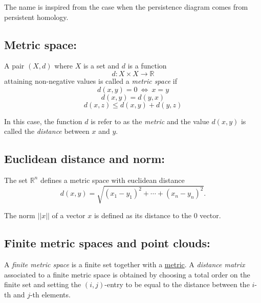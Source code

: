 \documentclass{amsart}
\begin{document}
	The name is inspired from the case when the persistence diagram comes from persistent homology.
	
	\subsection*{Metric space:} \label{metric space}
	
	A pair $(X, d)$ where $X$ is a set and $d$ is a function 
	\begin{equation*}
	d : X \times X \to \mathbb R
	\end{equation*}
	attaining non-negative values is called a \textit{metric space} if
	\begin{equation*}
	d(x,y) = 0\ \Leftrightarrow\ x = y
	\end{equation*}
	\begin{equation*}
	d(x,y) = d(y,x)
	\end{equation*}
	\begin{equation*}
	d(x,z) \leq d(x,y) + d(y, z)
	\end{equation*}
	
	In this case, the function $d$ is refer to as the \textit{metric} and the value $d(x,y)$ is called the \textit{distance} between $x$ and $y$. 
	
	\subsection*{Euclidean distance and norm:} \label{euclidean distance and norm}
	
	The set $\mathbb R^n$ defines a metric space with euclidean distance
	\begin{equation*}
	d(x,y) = \sqrt{(x_1-y_1)^2 + \cdots + (x_n-y_n)^2}.
	\end{equation*}
	
	The norm $||x||$ of a vector $x$ is defined as its distance to the $0$ vector.
	
	\subsection*{Finite metric spaces and point clouds:} \label{finite metric spaces and point clouds}
	
	A \textit{finite metric space} is a finite set together with a \hyperref[metric space]{metric}. A \textit{distance matrix} associated to a finite metric space is obtained by choosing a total order on the finite set and setting the $(i,j)$-entry to be equal to the distance between the $i$-th and $j$-th elements. 
	
\end{document}
